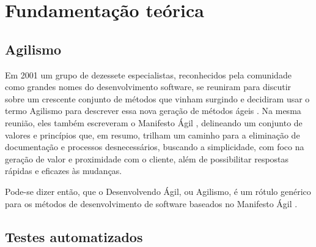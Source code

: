\chapter{Fundamentação teórica}

\section{Agilismo}
\label{sec:agilismo}

Em 2001 um grupo de dezessete especialistas, reconhecidos pela comunidade como grandes nomes do desenvolvimento software, se reuniram para discutir sobre um crescente conjunto de métodos que vinham surgindo e decidiram usar o termo Agilismo para descrever essa nova geração de métodos ágeis \cite{AgileStory}. Na mesma reunião, eles também escreveram o Manifesto Ágil \cite{AgileManifesto}, delineando um conjunto de valores e princípios que, em resumo, trilham um caminho para a eliminação de documentação e processos desnecessários, buscando a simplicidade, com foco na geração de valor e proximidade com o cliente, além de possibilitar respostas rápidas e eficazes às mudanças.

Pode-se dizer então, que o Desenvolvendo Ágil, ou Agilismo, é um rótulo genérico para os métodos de desenvolvimento de software baseados no Manifesto Ágil \cite{BDDRodrigo}.

\section{Testes automatizados}
\label{sec:testes_automatizados}

